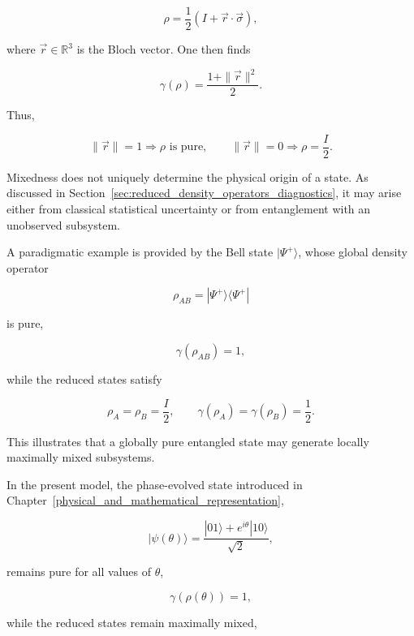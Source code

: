 \begin{equation}
\rho
=
\frac{1}{2}
\left(
I + \vec{r}\cdot\vec{\sigma}
\right),
\label{eq:single_qubit_bloch_representation}
\end{equation}

where \( \vec{r} \in \mathbb{R}^3 \) is the Bloch vector. One then finds

\begin{equation}
\gamma(\rho)
=
\frac{1+\|\vec{r}\|^2}{2}.
\label{eq:single_qubit_purity_bloch}
\end{equation}

Thus,

\[
\|\vec{r}\| = 1
\Rightarrow
\rho \text{ is pure},
\qquad
\|\vec{r}\| = 0
\Rightarrow
\rho = \frac{I}{2}.
\]

\medskip

Mixedness does not uniquely determine the physical origin of a state. As discussed in Section~\ref{sec:reduced_density_operators_diagnostics}, it may arise either from classical statistical uncertainty or from entanglement with an unobserved subsystem.

\medskip

A paradigmatic example is provided by the Bell state \( |\Psi^+\rangle \), whose global density operator

\[
\rho_{AB}
=
|\Psi^+\rangle\langle\Psi^+|
\]

is pure,

\[
\gamma(\rho_{AB}) = 1,
\]

while the reduced states satisfy

\[
\rho_A
=
\rho_B
=
\frac{I}{2},
\qquad
\gamma(\rho_A)
=
\gamma(\rho_B)
=
\frac{1}{2}.
\]

This illustrates that a globally pure entangled state may generate locally maximally mixed subsystems.

\medskip

In the present model, the phase-evolved state introduced in Chapter~\ref{physical_and_mathematical_representation},

\[
|\psi(\theta)\rangle
=
\frac{|01\rangle + e^{i\theta}|10\rangle}{\sqrt{2}},
\]

remains pure for all values of \( \theta \),

\begin{equation}
\gamma(\rho(\theta)) = 1,
\label{eq:phase_state_global_purity}
\end{equation}

while the reduced states remain maximally mixed,

